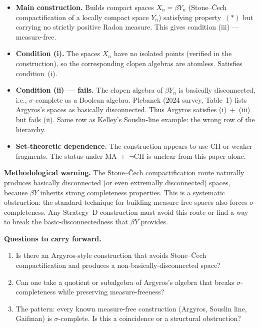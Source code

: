 \begin{itemize}[nosep]
  \item \textbf{Main construction.}  Builds compact spaces
    $X_n = \beta Y_n$ (Stone--\v{C}ech compactification of a
    locally compact space $Y_n$) satisfying property~$(*)$ but
    carrying no strictly positive Radon measure.  This gives
    condition (iii) --- measure-free.

  \item \textbf{Condition (i).}  The spaces $X_n$ have no isolated
    points (verified in the construction), so the corresponding
    clopen algebras are atomless.  Satisfies condition~(i).

  \item \textbf{Condition (ii) --- fails.}  The clopen algebra of
    $\beta Y_n$ is basically disconnected, i.e., $\sigma$-complete
    as a Boolean algebra.  Plebanek (2024 survey, Table~1) lists
    Argyros's spaces as basically disconnected.  Thus Argyros
    satisfies (i)~+~(iii) but fails (ii).  Same row as Kelley's
    Souslin-line example: the wrong row of the hierarchy.

  \item \textbf{Set-theoretic dependence.}  The construction
    appears to use CH or weaker fragments.  The status under
    MA~+~$\neg$CH is unclear from this paper alone.
\end{itemize}

\medskip\noindent
\textbf{Methodological warning.}  The Stone--\v{C}ech
compactification route naturally produces basically disconnected
(or even extremally disconnected) spaces, because $\beta Y$ inherits
strong completeness properties.  This is a systematic obstruction:
the standard technique for building measure-free spaces also
forces $\sigma$-completeness.  Any Strategy~D construction must
avoid this route or find a way to break the basic-disconnectedness
that $\beta Y$ provides.

\medskip\noindent
\textbf{Questions to carry forward.}
\begin{enumerate}[nosep]
  \item Is there an Argyros-style construction that avoids
    Stone--\v{C}ech compactification and produces a
    non-basically-disconnected space?
  \item Can one take a quotient or subalgebra of Argyros's algebra
    that breaks $\sigma$-completeness while preserving
    measure-freeness?
  \item The pattern: every known measure-free construction
    (Argyros, Souslin line, Gaifman) is $\sigma$-complete.
    Is this a coincidence or a structural obstruction?
\end{enumerate}

